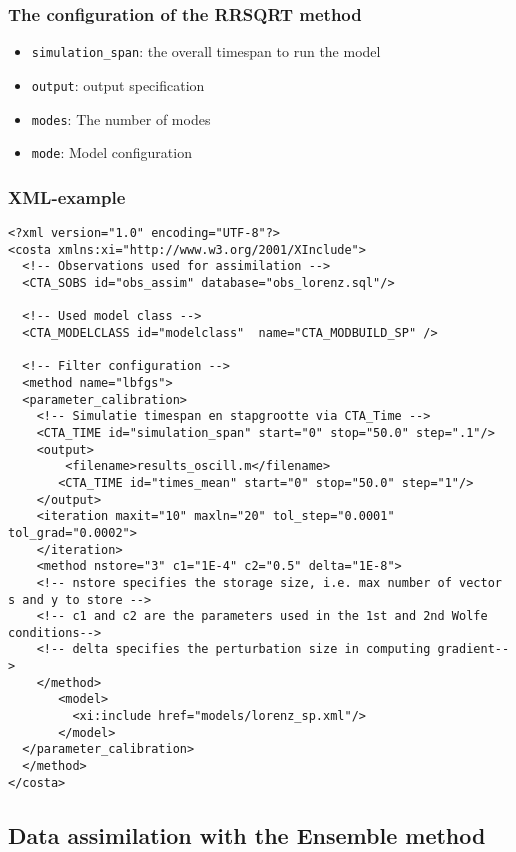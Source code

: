 \documentclass[a4paper,12pt]{article}
\begin{document}

\subsubsection{The configuration of the RRSQRT method}
\begin{itemize}
\item {\tt simulation\_span}: the overall timespan to run the model
\item {\tt output}: output specification
\item {\tt modes}: The number of modes
\item {\tt mode}: Model configuration
\end{itemize}

\subsubsection{XML-example}

\begin{verbatim}
<?xml version="1.0" encoding="UTF-8"?>
<costa xmlns:xi="http://www.w3.org/2001/XInclude">
  <!-- Observations used for assimilation -->
  <CTA_SOBS id="obs_assim" database="obs_lorenz.sql"/>

  <!-- Used model class -->
  <CTA_MODELCLASS id="modelclass"  name="CTA_MODBUILD_SP" />

  <!-- Filter configuration -->
  <method name="lbfgs">
  <parameter_calibration>
    <!-- Simulatie timespan en stapgrootte via CTA_Time -->
    <CTA_TIME id="simulation_span" start="0" stop="50.0" step=".1"/>
    <output>
        <filename>results_oscill.m</filename> 
       <CTA_TIME id="times_mean" start="0" stop="50.0" step="1"/>
    </output>
    <iteration maxit="10" maxln="20" tol_step="0.0001" tol_grad="0.0002">
    </iteration>
    <method nstore="3" c1="1E-4" c2="0.5" delta="1E-8">
    <!-- nstore specifies the storage size, i.e. max number of vector s and y to store -->
    <!-- c1 and c2 are the parameters used in the 1st and 2nd Wolfe conditions-->
    <!-- delta specifies the perturbation size in computing gradient-->
    </method>
       <model>
         <xi:include href="models/lorenz_sp.xml"/>
       </model>
  </parameter_calibration>
  </method>
</costa>
\end{verbatim}


\subsection{Data assimilation  with the Ensemble method}
\end{document}
